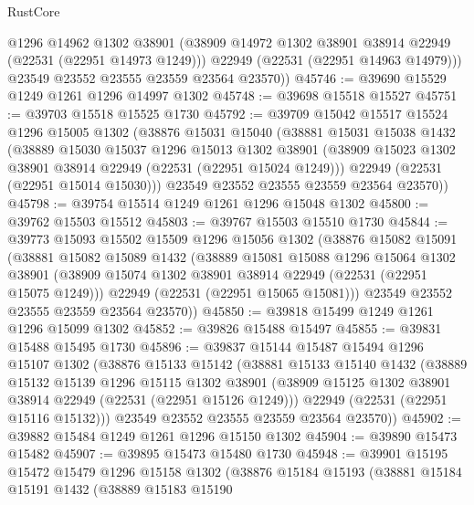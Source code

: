\begin{lexlean}{RustCore}
\begin{coremodule}
          @1296
          @14962
          @1302
          @38901
          (@38909 @14972 @1302 @38901 @38914 @22949 (@22531 (@22951 @14973 @1249)))
          @22949
          (@22531 (@22951 @14963 @14979)))
        @23549
        @23552
        @23555
        @23559
        @23564
        @23570))
@45746 := @39690 @15529 @1249 @1261 @1296 @14997 @1302
@45748 := @39698 @15518 @15527
@45751 := @39703 @15518 @15525 @1730
@45792 := @39709
    @15042
    @15517
    @15524
    @1296
    @15005
    @1302
    (@38876
      @15031
      @15040
      (@38881
        @15031
        @15038
        @1432
        (@38889
          @15030
          @15037
          @1296
          @15013
          @1302
          @38901
          (@38909 @15023 @1302 @38901 @38914 @22949 (@22531 (@22951 @15024 @1249)))
          @22949
          (@22531 (@22951 @15014 @15030)))
        @23549
        @23552
        @23555
        @23559
        @23564
        @23570))
@45798 := @39754 @15514 @1249 @1261 @1296 @15048 @1302
@45800 := @39762 @15503 @15512
@45803 := @39767 @15503 @15510 @1730
@45844 := @39773
    @15093
    @15502
    @15509
    @1296
    @15056
    @1302
    (@38876
      @15082
      @15091
      (@38881
        @15082
        @15089
        @1432
        (@38889
          @15081
          @15088
          @1296
          @15064
          @1302
          @38901
          (@38909 @15074 @1302 @38901 @38914 @22949 (@22531 (@22951 @15075 @1249)))
          @22949
          (@22531 (@22951 @15065 @15081)))
        @23549
        @23552
        @23555
        @23559
        @23564
        @23570))
@45850 := @39818 @15499 @1249 @1261 @1296 @15099 @1302
@45852 := @39826 @15488 @15497
@45855 := @39831 @15488 @15495 @1730
@45896 := @39837
    @15144
    @15487
    @15494
    @1296
    @15107
    @1302
    (@38876
      @15133
      @15142
      (@38881
        @15133
        @15140
        @1432
        (@38889
          @15132
          @15139
          @1296
          @15115
          @1302
          @38901
          (@38909 @15125 @1302 @38901 @38914 @22949 (@22531 (@22951 @15126 @1249)))
          @22949
          (@22531 (@22951 @15116 @15132)))
        @23549
        @23552
        @23555
        @23559
        @23564
        @23570))
@45902 := @39882 @15484 @1249 @1261 @1296 @15150 @1302
@45904 := @39890 @15473 @15482
@45907 := @39895 @15473 @15480 @1730
@45948 := @39901
    @15195
    @15472
    @15479
    @1296
    @15158
    @1302
    (@38876
      @15184
      @15193
      (@38881
        @15184
        @15191
        @1432
        (@38889
          @15183
          @15190

\end{coremodule}
\end{lexlean}
